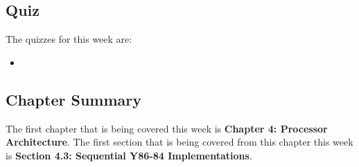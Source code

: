 \subsection{Quiz}

The quizzes for this week are:

\begin{itemize}
    \item {} \textbullet {} 
\end{itemize}

\subsection{Chapter Summary}

The first chapter that is being covered this week is \textbf{Chapter 4: Processor Architecture}. The first section that is being covered from this chapter this week is \textbf{Section 4.3: Sequential Y86-84 Implementations}.

